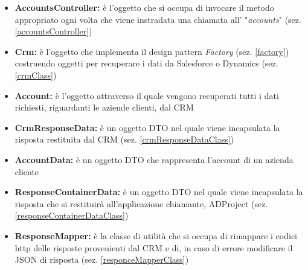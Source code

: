 \begin{itemize}
	\item \textbf{AccountsController:} è l'oggetto che si occupa di invocare il metodo appropriato ogni volta che viene instradata una chiamata all' "\textit{accounts}" (sez. \ref{accountsController})  
	\item \textbf{Crm:} è l'oggetto che implementa il design pattern \textit{Factory} (sez. \ref{factory}) costruendo oggetti per recuperare i dati da Salesforce o Dynamics (sez. \ref{crmClass})
	\item \textbf{Account:} è l'oggetto attraverso il quale vengono recuperati tutti i dati richiesti, riguardanti le aziende clienti, dal \gls{CRM}
	\item \textbf{CrmResponseData:} è un oggetto \gls{DTO} nel quale viene incapsulata la risposta  restituita dal \gls{CRM} (sez. \ref{crmResponseDataClass})
	\item \textbf{AccountData:} è un oggetto \gls{DTO} che rappresenta l'account di un azienda cliente
	\item \textbf{ResponseContainerData:}
	è un oggetto \gls{DTO} nel quale viene incapsulata la risposta  che si restituirà all'applicazione chiamante, ADProject (sez. \ref{responseContainerDataClass})
	\item \textbf{ResponseMapper:} è la classe di utilità che si occupa di rimappare i codici \gls{http} delle risposte provenienti dal \gls{CRM} e di, in caso di errore modificare il JSON di risposta (sez. \ref{responceMapperClass})

\end{itemize}